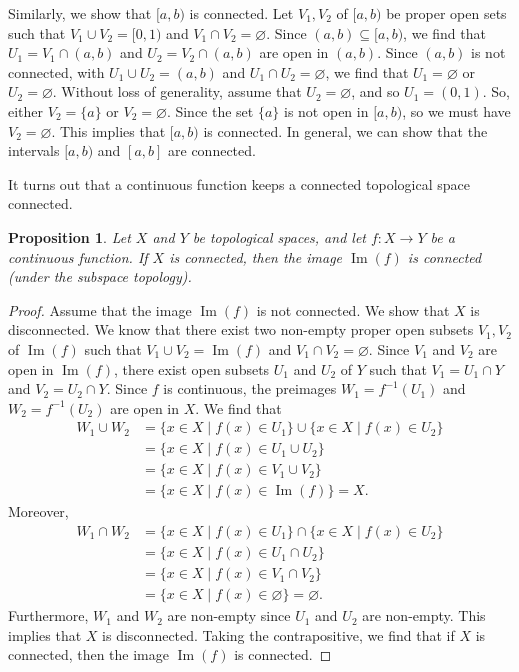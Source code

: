 \documentclass[a4paper, openany]{memoir}
\theoremstyle{definition}
\theoremstyle{plain}
\newtheorem{proposition}[definition]{Proposition}
\begin{document}
Similarly, we show that $[a, b)$ is connected. Let $V_1, V_2$ of $[a, b)$ be proper open sets such that $V_1 \cup V_2 = [0, 1)$ and $V_1 \cap V_2 = \varnothing$. Since $(a, b) \subseteq [a, b)$, we find that $U_1 = V_1 \cap (a, b)$ and $U_2 = V_2 \cap (a, b)$ are open in $(a, b)$. Since $(a, b)$ is not connected, with $U_1 \cup U_2 = (a, b)$ and $U_1 \cap U_2 = \varnothing$, we find that $U_1 = \varnothing$ or $U_2 = \varnothing$. Without loss of generality, assume that $U_2 = \varnothing$, and so $U_1 = (0, 1)$. So, either $V_2 = \{a\}$ or $V_2 = \varnothing$. Since the set $\{a\}$ is not open in $[a, b)$, so we must have $V_2 = \varnothing$. This implies that $[a, b)$ is connected. In general, we can show that the intervals $[a, b)$ and $[a, b]$ are connected.


It turns out that a continuous function keeps a connected topological space connected.
\begin{proposition}
Let $X$ and $Y$ be topological spaces, and let $f: X \to Y$ be a continuous function. If $X$ is connected, then the image $\operatorname{Im}(f)$ is connected (under the subspace topology).
\end{proposition}
\begin{proof}
Assume that the image $\operatorname{Im}(f)$ is not connected. We show that $X$ is disconnected. We know that there exist two non-empty proper open subsets $V_1, V_2$ of $\operatorname{Im}(f)$ such that $V_1 \cup V_2 = \operatorname{Im}(f)$ and $V_1 \cap V_2 = \varnothing$. Since $V_1$ and $V_2$ are open in $\operatorname{Im}(f)$, there exist open subsets $U_1$ and $U_2$ of $Y$ such that $V_1 = U_1 \cap Y$ and $V_2 = U_2 \cap Y$. Since $f$ is continuous, the preimages $W_1 = f^{-1}(U_1)$ and $W_2 = f^{-1}(U_2)$ are open in $X$. We find that
\begin{align*}
    W_1 \cup W_2 &= \{x \in X \mid f(x) \in U_1\} \cup \{x \in X \mid f(x) \in U_2\} \\
    &= \{x \in X \mid f(x) \in U_1 \cup U_2\} \\
    &= \{x \in X \mid f(x) \in V_1 \cup V_2\} \\
    &= \{x \in X \mid f(x) \in \operatorname{Im}(f)\} = X.
\end{align*}
Moreover,
\begin{align*}
    W_1 \cap W_2 &= \{x \in X \mid f(x) \in U_1\} \cap \{x \in X \mid f(x) \in U_2\} \\
    &= \{x \in X \mid f(x) \in U_1 \cap U_2\} \\
    &= \{x \in X \mid f(x) \in V_1 \cap V_2\} \\
    &= \{x \in X \mid f(x) \in \varnothing\} = \varnothing.
\end{align*}
Furthermore, $W_1$ and $W_2$ are non-empty since $U_1$ and $U_2$ are non-empty. This implies that $X$ is disconnected. Taking the contrapositive, we find that if $X$ is connected, then the image $\operatorname{Im}(f)$ is connected.
\end{proof}
\end{document}
